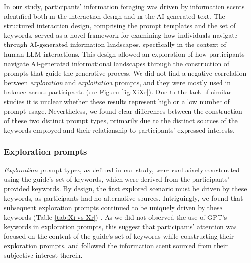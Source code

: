 \documentclass[sn-mathphys, Numbered]{sn-jnl}%
\theoremstyle{thmstyleone}%
\theoremstyle{thmstyletwo}%
\theoremstyle{thmstylethree}%
\begin{document}
In our study, participants' information foraging was driven by information scents identified both in the interaction design and in the AI-generated text. The structured interaction design, comprising the prompt templates and the set of keywords, served as a novel framework for examining how individuals navigate through AI-generated information landscapes, specifically in the context of human-LLM interactions. This design allowed an exploration of how participants navigate AI-generated informational landscapes through the construction of prompts that guide the generative process. We did not find a negative correlation between \textit{exploration} and \textit{exploitation} prompts, and they were mostly used in balance across participants (see Figure \ref{fig:XiXr}). Due to the lack of similar studies it is unclear whether these results represent high or a low number of prompt usage. Nevertheless, we found clear differences between the construction of these two distinct prompt types, primarily due to the distinct sources of the keywords employed and their relationship to participants' expressed interests.

\subsubsection*{Exploration prompts}

\textit{Exploration} prompt types, as defined in our study, were exclusively constructed using the guide's set of keywords, which were derived from the participants' provided keywords. By design, the first explored scenario must be driven by these keywords, as participants had no alternative sources. Intriguingly, we found that subsequent exploration prompts continued to be uniquely driven by these keywords (Table \ref{tab:Xi vs Xr}) . As we did not observed the use of GPT's keywords in exploration prompts, this suggest that participants' attention was focused on the content of the guide's set of keywords while constructing their exploration prompts, and followed the information scent sourced from their subjective interest therein. 
\end{document}
